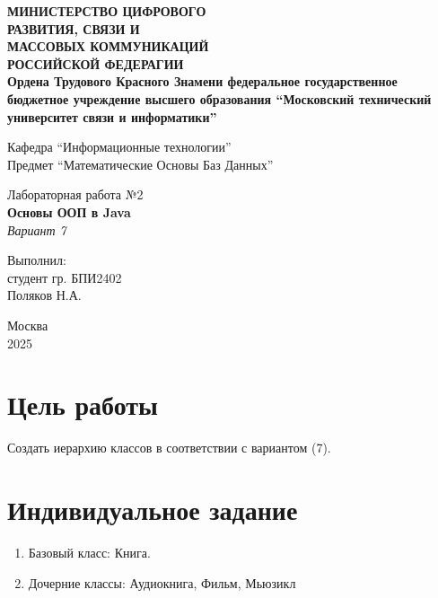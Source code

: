 \documentclass[a4paper, 17pt]{extarticle}
\begin{document}
\begin{titlepage}
  \begin{center}
    \small{ \bfseries{
    МИНИСТЕРСТВО ЦИФРОВОГО \\ РАЗВИТИЯ, СВЯЗИ И \\ МАССОВЫХ
    КОММУНИКАЦИЙ \\ РОССИЙСКОЙ ФЕДЕРАГИИ \\ Ордена Трудового Красного
    Знамени федеральное государственное бюджетное учреждение высшего
    образования \enquote{Московский технический университет связи и
    информатики}}\\
  \mdseries}

    \vspace{1.7cm}

    \normalsize{Кафедра \enquote{Информационные технологии}} \\
    \normalsize{Предмет \enquote{Математические Основы Баз Данных}}

    \vspace{0.3cm}
    \huge{Лабораторная работа №2} \\
    \large{\textbf{Основы ООП в Java}} \\
    \vspace{0.3cm}
    \normalsize{\textit{Вариант 7}}

    \vspace{2.7cm}

    \raggedleft 
    \normalsize{Выполнил: \\ студент гр. БПИ2402 
    \\\vspace{0.125cm} Поляков Н.А.\\}
    \centering

    \vspace{\fill}

    Москва \\ 2025

  \end{center}
\end{titlepage}

\tableofcontents
\pagebreak

\section{Цель работы}
Создать иерархию классов в соответствии с вариантом (7).
\section{Индивидуальное задание}
\begin{enumerate}
  \item Базовый класс: Книга.
  \item Дочерние классы: Аудиокнига, Фильм, Мьюзикл
\end{enumerate}
\end{document}
